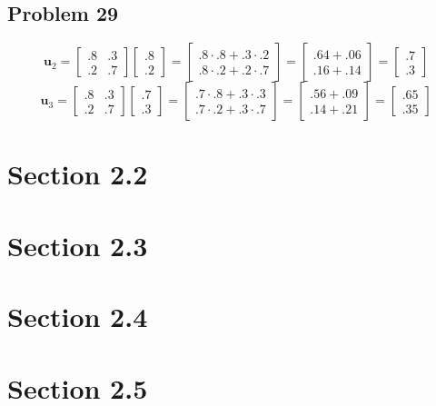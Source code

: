 \documentclass[12pt]{article}
\begin{document}
\subsection*{Problem 29}
\[ 
\boldsymbol{u}_2
=   \begin{bmatrix} .8 & .3 \\ .2 & .7 \end{bmatrix}
    \begin{bmatrix} .8 \\ .2 \end{bmatrix}
= \begin{bmatrix} .8 \cdot .8 + .3 \cdot .2 \\ .8 \cdot .2 + .2 \cdot .7 \end{bmatrix}
= \begin{bmatrix} .64 + .06 \\ .16 + .14 \end{bmatrix}
= \begin{bmatrix} .7 \\ .3 \end{bmatrix}
\]
\[ 
\boldsymbol{u}_3
=   \begin{bmatrix} .8 & .3 \\ .2 & .7 \end{bmatrix}
    \begin{bmatrix} .7 \\ .3 \end{bmatrix}
= \begin{bmatrix} .7 \cdot .8 + .3 \cdot .3 \\ .7 \cdot .2 + .3 \cdot .7 \end{bmatrix}
= \begin{bmatrix} .56 + .09 \\ .14 + .21 \end{bmatrix}
= \begin{bmatrix} .65 \\ .35 \end{bmatrix}
\]

\section*{Section 2.2}

\section*{Section 2.3}

\section*{Section 2.4}

\section*{Section 2.5}
\end{document}
